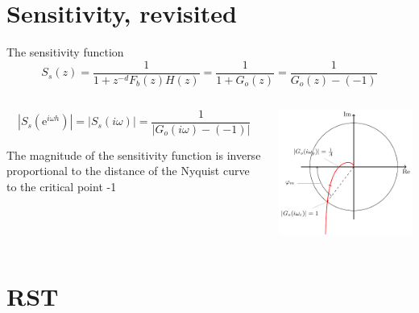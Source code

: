 \documentclass[presentation,aspectratio=169]{beamer}
\begin{document}
\section{Sensitivity, revisited}
\label{sec:orgaa3ab2a}
\begin{frame}[label={sec:org523ac99}]{The sensitivity function}
\[S_s(z) = \frac{1}{1 + z^{-d}F_b(z)H(z)} = \frac{1}{1 + G_o(z)}= \frac{1}{G_o(z) - (-1)}\]


\begin{columns}
\begin{column}{0.45\columnwidth}
\[|S_s(\mathrm{e}^{i\omega h})| = |S_s(i\omega)| = \frac{1}{| G_o(i\omega) - (-1)|}\]

\alert{The magnitude of the sensitivity function is inverse proportional to the distance of the Nyquist curve to the critical point -1}
\end{column}

\begin{column}{0.65\columnwidth}
\begin{center}
\includegraphics[width=0.6\linewidth]{../../figures/implane-nyquist-margins}
\end{center}
\end{column}
\end{columns}
\end{frame}



\section{RST}
\label{sec:orgb0db44e}
\end{document}
